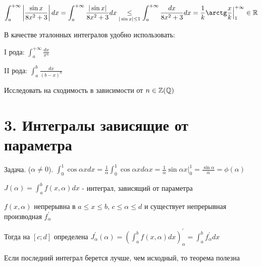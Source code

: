 \documentclass[12pt]{article}
\begin{document}
\begin{enumerate}[label*=\textbf{\arabic** }]
        $\displaystyle \int^{+\infty}_{a} \left|\frac{\sin x}{8x^2 + 3}\right| dx = \int^{+\infty}_{a} \frac{|\sin x|}{8x^2 + 3} dx \underset{|\sin x| \leq 1}{\leq} \int^{+\infty}_{a} \frac{dx}{8x^2 + 3} dx = \frac{1}{k} \arctg\frac{x}{k} \Big|^{+\infty}_{1} \in \Real$

        \mediumvspace

        В качестве эталонных интегралов удобно использовать:

        I рода: $\displaystyle \int^{+\infty}_{a} \frac{dx}{x^n}$

        II рода: $\displaystyle \int^{b}_{a} \frac{dx}{(b - x)^n}$

        \Lab Исследовать на сходимость в зависимости от $n \in \mathbb{Z} (\mathbb{Q})$
    \end{enumerate}
    
    \clearpage

    \section{3. Интегралы зависящие от параметра}

    Задача. \Exs ($\alpha \neq 0$). $\displaystyle \int^{1}_{0} \cos\alpha x dx = \frac{1}{\alpha} \int^{1}_{0} \cos\alpha x d\alpha x = \frac{1}{\alpha} \sin \alpha x \Big|^{1}_{0} = \frac{\sin\alpha}{\alpha} = \phi(\alpha)$

    $\displaystyle J(\alpha) = \int^b_a f(x, \alpha)dx$ - интеграл, зависящий от параметра

    \begin{MyTheorem}
        $f(x, \alpha)$ непрерывна в $a \leq x \leq b$, $c \leq \alpha \leq d$ и существует непрерывная производная $f^\prime_\alpha$

        Тогда на $[c;d]$ определена $J^\prime_\alpha(\alpha) = \left(\int^b_a f(x, \alpha)dx\right)^\prime_\alpha = \int^b_a f^\prime_\alpha dx$
    \end{MyTheorem}

    Если последний интеграл берется лучше, чем исходный, то теорема полезна
\end{document}
